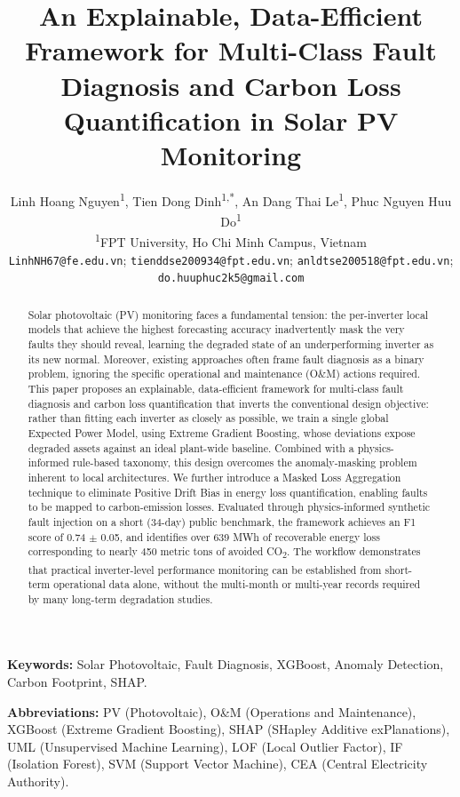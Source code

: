 \documentclass[11pt,a4paper,twoside]{article}
\title{\textbf{An Explainable, Data-Efficient Framework for Multi-Class Fault Diagnosis and Carbon Loss Quantification in Solar PV Monitoring}}
\author{%
\begin{tabular}{c}
Linh Hoang Nguyen\textsuperscript{1},
Tien Dong Dinh\textsuperscript{1,*},
An Dang Thai Le\textsuperscript{1},
Phuc Nguyen Huu Do\textsuperscript{1} \\[0.35em]
\textsuperscript{1}FPT University, Ho Chi Minh Campus, Vietnam \\[0.25em]
\small \texttt{LinhNH67@fe.edu.vn}; \texttt{tienddse200934@fpt.edu.vn}; \texttt{anldtse200518@fpt.edu.vn}; \texttt{do.huuphuc2k5@gmail.com} \\[0.20em]
\end{tabular}%
}
\date{}
\begin{document}
\maketitle
\thispagestyle{empty}

\begin{abstract}
Solar photovoltaic (PV) monitoring faces a fundamental tension: the per-inverter local models that achieve the highest forecasting accuracy inadvertently mask the very faults they should reveal, learning the degraded state of an underperforming inverter as its new normal. Moreover, existing approaches often frame fault diagnosis as a binary problem, ignoring the specific operational and maintenance (O\&M) actions required. This paper proposes an explainable, data-efficient framework for multi-class fault diagnosis and carbon loss quantification that inverts the conventional design objective: rather than fitting each inverter as closely as possible, we train a single global Expected Power Model, using Extreme Gradient Boosting, whose deviations expose degraded assets against an ideal plant-wide baseline. Combined with a physics-informed rule-based taxonomy, this design overcomes the anomaly-masking problem inherent to local architectures. We further introduce a Masked Loss Aggregation technique to eliminate Positive Drift Bias in energy loss quantification, enabling faults to be mapped to carbon-emission losses. Evaluated through physics-informed synthetic fault injection on a short (34-day) public benchmark, the framework achieves an F1 score of 0.74 $\pm$ 0.05, and identifies over 639 MWh of recoverable energy loss corresponding to nearly 450 metric tons of avoided CO\textsubscript{2}. The workflow demonstrates that practical inverter-level performance monitoring can be established from short-term operational data alone, without the multi-month or multi-year records required by many long-term degradation studies.
\end{abstract}

\noindent\textbf{Keywords:} Solar Photovoltaic, Fault Diagnosis, XGBoost, Anomaly Detection, Carbon Footprint, SHAP.

\vspace{1em}
\noindent\textbf{Abbreviations:} PV (Photovoltaic), O\&M (Operations and Maintenance), XGBoost (Extreme Gradient Boosting), SHAP (SHapley Additive exPlanations), UML (Unsupervised Machine Learning), LOF (Local Outlier Factor), IF (Isolation Forest), SVM (Support Vector Machine), CEA (Central Electricity Authority).
\vspace{1em}
\end{document}
